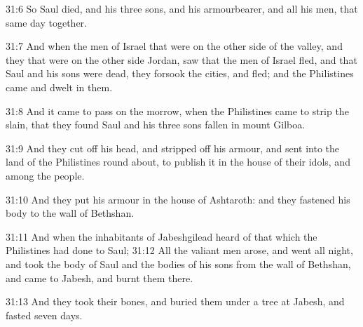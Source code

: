 31:6 So Saul died, and his three sons, and his armourbearer, and all his men, that same day together.

31:7 And when the men of Israel that were on the other side of the valley, and they that were on the other side Jordan, saw that the men of Israel fled, and that Saul and his sons were dead, they forsook the cities, and fled; and the Philistines came and dwelt in them.

31:8 And it came to pass on the morrow, when the Philistines came to strip the slain, that they found Saul and his three sons fallen in mount Gilboa.

31:9 And they cut off his head, and stripped off his armour, and sent into the land of the Philistines round about, to publish it in the house of their idols, and among the people.

31:10 And they put his armour in the house of Ashtaroth: and they fastened his body to the wall of Bethshan.

31:11 And when the inhabitants of Jabeshgilead heard of that which the Philistines had done to Saul; 31:12 All the valiant men arose, and went all night, and took the body of Saul and the bodies of his sons from the wall of Bethshan, and came to Jabesh, and burnt them there.

31:13 And they took their bones, and buried them under a tree at Jabesh, and fasted seven days.

